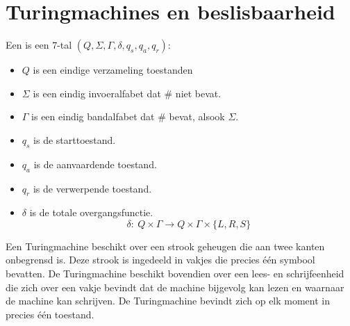 \documentclass[main.tex]{subfiles}
\begin{document}
\chapter{Turingmachines en beslisbaarheid}
\label{cha:turingmachines-en-beslisbaarheid}


\begin{de}
  Een  is een $7$-tal $(Q,\Sigma,\Gamma, \delta, q_{s}, q_{a}, q_{r})$:
  \begin{itemize}
  \item $Q$ is een eindige verzameling toestanden
  \item $\Sigma$ is een eindig invoeralfabet dat $\#$ niet bevat.
  \item $\Gamma$ is een eindig bandalfabet dat $\#$ bevat, alsook $\Sigma$.
  \item $q_{s}$ is de starttoestand.
  \item $q_{a}$ is de aanvaardende toestand.
  \item $q_{r}$ is de verwerpende toestand.
  \item $\delta$ is de totale overgangsfunctie.
  \[ \delta:\ Q \times \Gamma \rightarrow Q \times \Gamma \times \{L,R,S\} \]
  \end{itemize}
  Een Turingmachine beschikt over een strook geheugen die aan twee kanten onbegrensd is.
  Deze strook is ingedeeld in vakjes die precies \'e\'en symbool bevatten.
  De Turingmachine beschikt bovendien over een lees- en schrijfeenheid die zich over een vakje bevindt dat de machine bijgevolg kan lezen en waarnaar de machine kan schrijven.
  De Turingmachine bevindt zich op elk moment in precies \'e\'en toestand.
\end{de}
\end{document}
